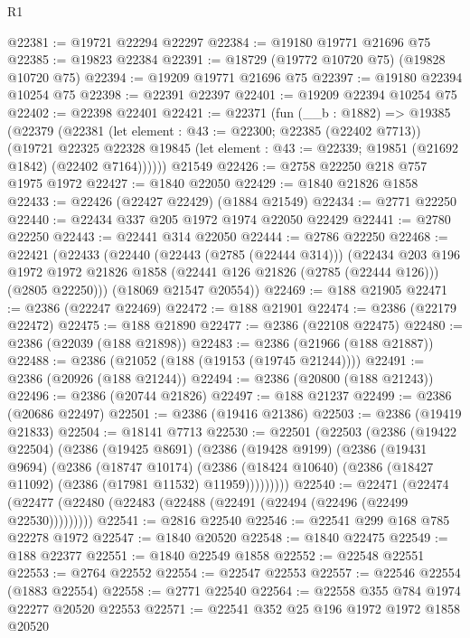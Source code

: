 \begin{lexlean}{R1}
\begin{coremodule}
@22381 := @19721 @22294 @22297
@22384 := @19180 @19771 @21696 @75
@22385 := @19823 @22384
@22391 := @18729 (@19772 @10720 @75) (@19828 @10720 @75)
@22394 := @19209 @19771 @21696 @75
@22397 := @19180 @22394 @10254 @75
@22398 := @22391 @22397
@22401 := @19209 @22394 @10254 @75
@22402 := @22398 @22401
@22421 := @22371
    (fun (__b : @1882) =>
    @19385
      (@22379
        (@22381
          (let element : @43 := @22300; @22385 (@22402 @7713))
          (@19721
            @22325
            @22328
            @19845
            (let element : @43 := @22339; @19851 (@21692 @1842) (@22402 @7164))))))
    @21549
@22426 := @2758 @22250 @218 @757 @1975 @1972
@22427 := @1840 @22050
@22429 := @1840 @21826 @1858
@22433 := @22426 (@22427 @22429) (@1884 @21549)
@22434 := @2771 @22250
@22440 := @22434 @337 @205 @1972 @1974 @22050 @22429
@22441 := @2780 @22250
@22443 := @22441 @314 @22050
@22444 := @2786 @22250
@22468 := @22421
    (@22433
      (@22440
        (@22443 (@2785 (@22444 @314)))
        (@22434
          @203
          @196
          @1972
          @1972
          @21826
          @1858
          (@22441 @126 @21826 (@2785 (@22444 @126)))
          (@2805 @22250)))
      (@18069 @21547 @20554))
@22469 := @188 @21905
@22471 := @2386 (@22247 @22469)
@22472 := @188 @21901
@22474 := @2386 (@22179 @22472)
@22475 := @188 @21890
@22477 := @2386 (@22108 @22475)
@22480 := @2386 (@22039 (@188 @21898))
@22483 := @2386 (@21966 (@188 @21887))
@22488 := @2386 (@21052 (@188 (@19153 (@19745 @21244))))
@22491 := @2386 (@20926 (@188 @21244))
@22494 := @2386 (@20800 (@188 @21243))
@22496 := @2386 (@20744 @21826)
@22497 := @188 @21237
@22499 := @2386 (@20686 @22497)
@22501 := @2386 (@19416 @21386)
@22503 := @2386 (@19419 @21833)
@22504 := @18141 @7713
@22530 := @22501
    (@22503
      (@2386
        (@19422 @22504)
        (@2386
          (@19425 @8691)
          (@2386
            (@19428 @9199)
            (@2386
              (@19431 @9694)
              (@2386
                (@18747 @10174)
                (@2386 (@18424 @10640) (@2386 (@18427 @11092) (@2386 (@17981 @11532) @11959)))))))))
@22540 := @22471
    (@22474 (@22477 (@22480 (@22483 (@22488 (@22491 (@22494 (@22496 (@22499 @22530)))))))))
@22541 := @2816 @22540
@22546 := @22541 @299 @168 @785 @22278 @1972
@22547 := @1840 @20520
@22548 := @1840 @22475
@22549 := @188 @22377
@22551 := @1840 @22549 @1858
@22552 := @22548 @22551
@22553 := @2764 @22552
@22554 := @22547 @22553
@22557 := @22546 @22554 (@1883 @22554)
@22558 := @2771 @22540
@22564 := @22558 @355 @784 @1974 @22277 @20520 @22553
@22571 := @22541 @352 @25 @196 @1972 @1972 @1858 @20520

\end{coremodule}
\end{lexlean}

